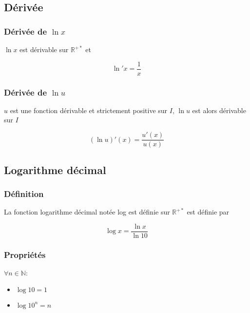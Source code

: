 \documentclass[a4paper]{article}
\begin{document}
\subsection{Dérivée}
\subsubsection{Dérivée de $\ln{x}$}

{$\ln{x}$ est dérivable sur $\mathbb{R}^{+*}$ et}

\[\ln{}\prime x = \frac{1}{x}\]

\subsubsection{Dérivée de $\ln{u}$}

{$u$ est une fonction dérivable et strictement positive sur $I$, $\ln{u}$ est alors dérivable sur $I$}

\[\left(\ln{u}\right)\prime(x)=\frac{u\prime(x)}{u(x)}\]

\subsection{Logarithme décimal}
\subsubsection{Définition}

{La fonction logarithme décimal notée log est définie sur $\mathbb{R}^{+*}$ est définie par}

\[\log{x}=\frac{\ln{x}}{\ln{10}}\]

\subsubsection{Propriétés}

{$\forall n \in \mathbb{N}$:}

\begin{multicols}{2}
	\begin{itemize}
  		\item{$\log{10}=1$}
  		\item{$\log{10^n}=n$}
	\end{itemize}
\end{multicols}
\end{document}
